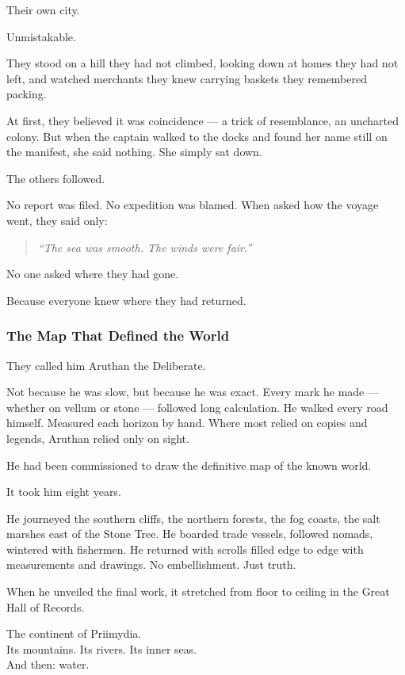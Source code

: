 \documentclass[12pt]{article}
\begin{document}
Their own city.

Unmistakable.

They stood on a hill they had not climbed, looking down at homes they had not left, and watched merchants they knew carrying baskets they remembered packing.

At first, they believed it was coincidence — a trick of resemblance, an uncharted colony. But when the captain walked to the docks and found her name still on the manifest, she said nothing. She simply sat down.

The others followed.

No report was filed. No expedition was blamed. When asked how the voyage went, they said only:

\begin{quote}
\emph{``The sea was smooth. The winds were fair.''}
\end{quote}

No one asked where they had gone.

Because everyone knew where they had returned.

\dotfill

\subsubsection*{The Map That Defined the World}

They called him Aruthan the Deliberate.

Not because he was slow, but because he was exact. Every mark he made — whether on vellum or stone — followed long calculation. He walked every road himself. Measured each horizon by hand. Where most relied on copies and legends, Aruthan relied only on sight.

He had been commissioned to draw the definitive map of the known world.

It took him eight years.

He journeyed the southern cliffs, the northern forests, the fog coasts, the salt marshes east of the Stone Tree. He boarded trade vessels, followed nomads, wintered with fishermen. He returned with scrolls filled edge to edge with measurements and drawings. No embellishment. Just truth.

When he unveiled the final work, it stretched from floor to ceiling in the Great Hall of Records.

The continent of Priimydia.\\
Its mountains. Its rivers. Its inner seas.\\
And then: water.
\end{document}
